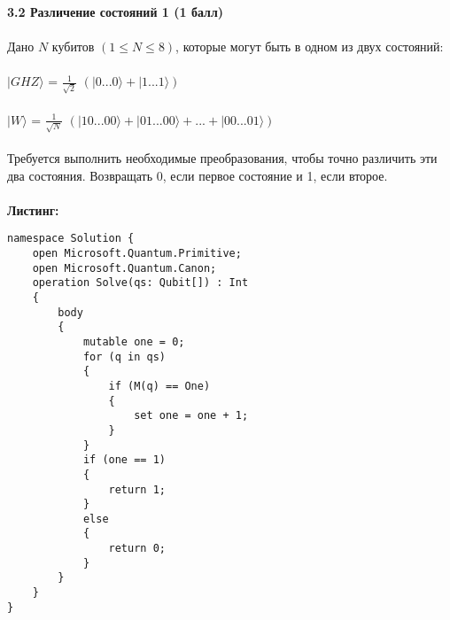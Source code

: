 \documentclass{article}
\begin{document}
\textbf{\Large 3.2 Различение состояний 1 (1 балл)}\\\\
\hfill \break
Дано \(N\) кубитов \((1 \leq N \leq 8)\), которые могут быть в одном из двух состояний:\\\\
\(|GHZ\rangle\) = \(\frac{1}{\sqrt{2}}\) \((|0 ... 0\rangle + |1 ... 1\rangle)\)\\\\
\(|W\rangle\) = \(\frac{1}{\sqrt{N}}\) \((|10 ... 00\rangle + |01 ... 00\rangle + ... + |00 ... 01\rangle)\)\\\\
Требуется выполнить необходимые преобразования, чтобы точно различить эти два состояния. Возвращать 0, если первое состояние и 1, если второе.\\\\
\textbf{Листинг:}\\
\begin{lstlisting}
namespace Solution {
    open Microsoft.Quantum.Primitive;
    open Microsoft.Quantum.Canon;
    operation Solve(qs: Qubit[]) : Int 
	{
        body 
		{   
            mutable one = 0;
            for (q in qs) 
			{
                if (M(q) == One) 
				{ 
                    set one = one + 1; 
                }
            }
            if (one == 1) 
			{
                return 1;
            } 
			else 
			{
                return 0;
            }                
        }
    }
}
\end{lstlisting}
\end{document}
